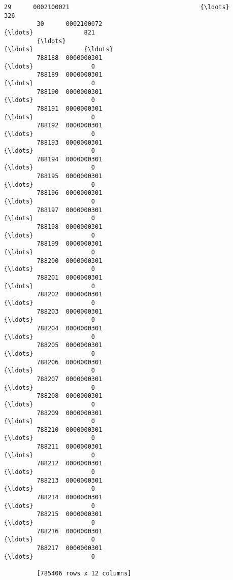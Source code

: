 \documentclass[11pt]{article}
\begin{document}
\begin{Verbatim}[commandchars=\\\{\}]
         29      0002100021                                    {\ldots}              326  
         30      0002100072                                    {\ldots}              821  
         {\ldots}                                                   {\ldots}              {\ldots}  
         788188  0000000301                                    {\ldots}                0  
         788189  0000000301                                    {\ldots}                0  
         788190  0000000301                                    {\ldots}                0  
         788191  0000000301                                    {\ldots}                0  
         788192  0000000301                                    {\ldots}                0  
         788193  0000000301                                    {\ldots}                0  
         788194  0000000301                                    {\ldots}                0  
         788195  0000000301                                    {\ldots}                0  
         788196  0000000301                                    {\ldots}                0  
         788197  0000000301                                    {\ldots}                0  
         788198  0000000301                                    {\ldots}                0  
         788199  0000000301                                    {\ldots}                0  
         788200  0000000301                                    {\ldots}                0  
         788201  0000000301                                    {\ldots}                0  
         788202  0000000301                                    {\ldots}                0  
         788203  0000000301                                    {\ldots}                0  
         788204  0000000301                                    {\ldots}                0  
         788205  0000000301                                    {\ldots}                0  
         788206  0000000301                                    {\ldots}                0  
         788207  0000000301                                    {\ldots}                0  
         788208  0000000301                                    {\ldots}                0  
         788209  0000000301                                    {\ldots}                0  
         788210  0000000301                                    {\ldots}                0  
         788211  0000000301                                    {\ldots}                0  
         788212  0000000301                                    {\ldots}                0  
         788213  0000000301                                    {\ldots}                0  
         788214  0000000301                                    {\ldots}                0  
         788215  0000000301                                    {\ldots}                0  
         788216  0000000301                                    {\ldots}                0  
         788217  0000000301                                    {\ldots}                0  
         
         [785406 rows x 12 columns]
\end{Verbatim}
            
\end{document}
